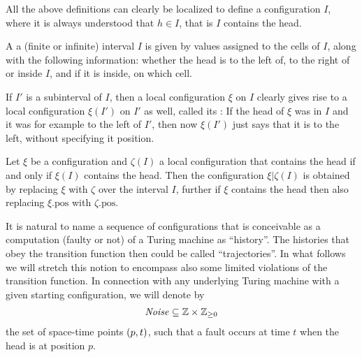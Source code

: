 \documentclass[11pt]{memoir}
\theoremstyle{definition} %
\renewcommand{\ge}{\geq}
\newcommand{\h}{h}
\newcommand{\Noise}{\mathit{Noise}}
\newcommand{\pos}{\mathrm{pos}}
\begin{document}
All the above definitions can clearly be localized to define a configuration
 \( I \), where it is always understood that \( \h\in I \), that is 
\( I \) contains the head.

\begin{definition}
\label{def:local-config}
  A  a (finite or infinite)
  interval \( I \) is given by values assigned to the cells
  of \( I \), along with the following information: whether
  the head is to the left of, to the right of or inside
  \( I \), and if it is inside, on which cell.

  If \( I' \) is a subinterval of \( I \), then a local configuration
  \( \xi \) on \( I \) clearly gives rise to a local configuration
  \( \xi(I') \) on \( I' \) as well, called its
  : If the head of \( \xi \) was in \( I \)
  and it was for example to the left of \( I' \), then now
  \( \xi(I') \) just says that it is to the left, without specifying it position.

  Let \( \xi \) be a configuration and \( \zeta(I) \) a local
  configuration that contains the head if and only if
  \( \xi(I) \) contains the head.
  Then the configuration \( \xi\vert\zeta(I) \) is obtained by
  replacing \( \xi \) with \( \zeta \) over the interval \( I \),
  further if \( \xi \) contains the head then also replacing
  \( \xi.\pos \) with \( \zeta.\pos \).
\end{definition}

It is natural to name a sequence of configurations that is conceivable as a computation
(faulty or not) of a Turing machine as ``history''.
The histories that obey the transition function then could be called ``trajectories''.
In what follows we will 
stretch this notion to encompass also some limited violations of the
transition function.
In connection with any underlying Turing machine with a given starting configuration, we will
denote by
\begin{align}\label{eq:noise-first}
   \Noise\subseteq \bbZ\times \bbZ_{\ge 0}
\end{align}
the set of space-time points \( (p,t) \), such that
a fault occurs at time \( t \) when the head is at position \( p \).
\end{document}
